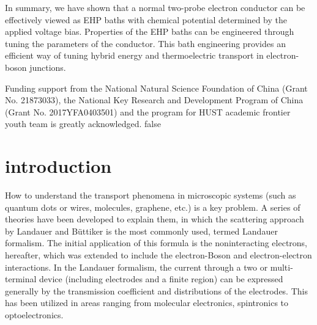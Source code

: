 \documentclass[aps
,twocolumn
,floatfix,footinbib,prl
]{revtex4-1}
\begin{document}
In summary, we have shown that a normal two-probe electron conductor can be effectively viewed as EHP baths with chemical potential determined by the applied voltage bias. Properties of the EHP baths can be engineered through tuning the parameters of the conductor. This bath engineering provides an efficient way of tuning hybrid energy and thermoelectric transport in electron-boson junctions.

Funding support from the National Natural Science Foundation of China
(Grant No. 21873033), the National Key Research and Development Program of China
(Grant No. 2017YFA0403501) and the program for HUST academic frontier youth team is greatly acknowledged.
\if false
\clearpage
\appendix
\section{introduction}
How to understand the transport phenomena in microscopic systems (such as quantum dots or wires, molecules, graphene, etc.) is a key problem. A series of
theories have been developed to explain them, in which the scattering approach by Landauer\cite{landauer1957spatial} and B\"{u}ttiker\cite{buttiker1986four} is the most commonly used, termed Landauer formalism. The initial application of this formula is the noninteracting electrons, hereafter, which was extended to include the electron-Boson and electron-electron interactions\cite{meir1992landauer,jauho1994time,lu2007coupled}.
In the Landauer formalism, the current through a two or multi- terminal device (including electrodes and a finite region) can be expressed generally by the transmission coefficient and distributions of the electrodes. This has been utilized in areas ranging from molecular electronics, spintronics to optoelectronics\cite{galperin2007molecular,haug2008quantum,galperin2012molecular}.
\end{document}
